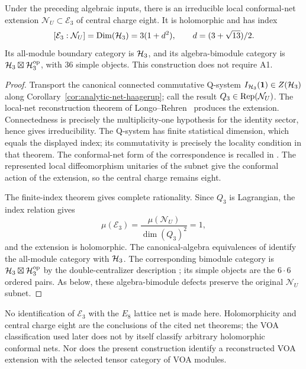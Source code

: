 \begin{corollary}
\label{cor:analytic-net-extension}
Under the preceding algebraic inputs, there is an irreducible local
conformal-net extension $\mathcal N_U\subset\mathcal E_3$ of central
charge eight.  It is holomorphic and has index
\[
 [\mathcal E_3:\mathcal N_U]
 =\operatorname{Dim}(\mathcal H_3)=3(1+d^2),
 \qquad d=(3+\sqrt{13})/2.
\]
Its all-module boundary category is $\mathcal H_3$, and its algebra-bimodule
category is $\mathcal H_3\boxtimes\mathcal H_3^{\mathrm{op}}$, with $36$ simple
objects.  This construction does not require A1.
\end{corollary}
\begin{proof}
Transport the canonical connected commutative Q-system
$I_{\mathcal H_3}(\mathbf1)\in Z(\mathcal H_3)$ along
Corollary~\ref{cor:analytic-net-haagerup}; call the result
$Q_3\in\operatorname{Rep}(\mathcal N_U)$.  The local-net reconstruction theorem
of Longo--Rehren~\cite[Theorem~4.9]{LRNets} produces the extension.
Connectedness is precisely the multiplicity-one hypothesis for the
identity sector, hence gives irreducibility.  The Q-system has finite
statistical dimension, which equals the displayed index; its
commutativity is precisely the locality condition in that theorem.
The conformal-net form of the correspondence is recalled in
\cite[Section~2.6]{BisTY}.  The represented local diffeomorphism
unitaries of the subnet give the conformal action of the extension,
so the central charge remains eight.

The finite-index theorem \cite[Theorem~24]{Longo} gives complete
rationality.  Since $Q_3$ is Lagrangian, the index relation gives
\[
 \mu(\mathcal E_3)
 =\frac{\mu(\mathcal N_U)}{\dim(Q_3)^2}=1,
\]
and the extension is holomorphic.  The canonical-algebra equivalences
of \cite[Corollary~4.1 and Proposition~4.4]{DMNO} identify the
all-module category with $\mathcal H_3$.  The corresponding bimodule
category is $\mathcal H_3\boxtimes\mathcal H_3^{\mathrm{op}}$ by the
double-centralizer description \cite[Sections~4 and~8]{Mueger}; its
simple objects are the $6\cdot6$ ordered pairs.  As below, these
algebra-bimodule defects preserve the original $\mathcal N_U$ subnet.
\end{proof}

No identification of $\mathcal E_3$ with the $E_8$ lattice net is made
here.  Holomorphicity and central charge eight are the conclusions
of the cited net theorems; the VOA classification used later does not
by itself classify arbitrary holomorphic conformal nets.  Nor does
the present construction identify a reconstructed VOA extension with
the selected tensor category of VOA modules.

